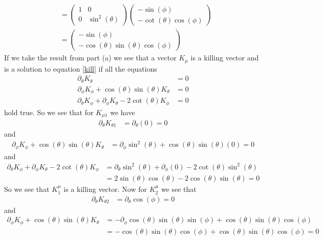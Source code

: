 \documentclass[11pt]{article}
\numberwithin{equation}{section}
\begin{document}
\begin{enumerate}[(a)]
\begin{align*}
&= \left(\begin{array}{cc}
	1	&0\\
	0	&\sin^2(\theta)
	\end{array}\right)
	\left(\begin{array}{c}
	-\sin(\phi)\\ -\cot(\theta)\cos(\phi)	\end{array}\right)\\
&=	\left(\begin{array}{c}
	-\sin(\phi)\\ -\cos(\theta)\sin(\theta)\cos(\phi)\end{array}\right)
\end{align*}
If we take the result from part (a) we see that a vector $K_{\mu}$ is a killing vector and is a solution to equation \ref{kill} if all the equations
\begin{align*}
\partial_{\theta}K_{\theta} &= 0\\
\partial_{\phi}K_{\phi} + \cos(\theta)\sin(\theta)K_{\theta} &= 0\\
\partial_{\theta}K_{\phi} + \partial_{\phi}K_{\theta} - 2\cot(\theta)K_{\phi} &= 0 
\end{align*}
hold true. So we see that for $K_{\mu1}$ we have
\begin{align*}
\partial_{\theta}K_{\theta1} &= \partial_{\theta}(0) = 0
\end{align*}
and
\begin{align*}
\partial_{\phi}K_{\phi} + \cos(\theta)\sin(\theta)K_{\theta} &= \partial_{\phi}\sin^2(\theta) + \cos(\theta)\sin(\theta)(0) = 0
\end{align*}
and
\begin{align*}
\partial_{\theta}K_{\phi} + \partial_{\phi}K_{\theta} - 2\cot(\theta)K_{\phi} &= \partial_{\theta}\sin^2(\theta) + \partial_{\phi}(0) - 2\cot(\theta)\sin^2(\theta)\\
&= 2\sin(\theta)\cos(\theta) - 2\cos(\theta)\sin(\theta) = 0
\end{align*}
So we see that $K^{\mu}_{1}$ is a killing vector. Now for $K^{\mu}_{2}$ we see that
\begin{align*}
\partial_{\theta}K_{\theta2} &= \partial_{\theta}\cos(\phi) = 0
\end{align*}
and
\begin{align*}
\partial_{\phi}K_{\phi} + \cos(\theta)\sin(\theta)K_{\theta} &= -\partial_{\phi}\cos(\theta)\sin(\theta)\sin(\phi) + \cos(\theta)\sin(\theta)\cos(\phi)\\
&= -\cos(\theta)\sin(\theta)\cos(\phi) + \cos(\theta)\sin(\theta)\cos(\phi) = 0

\end{align*}
\end{enumerate}
\end{document}

